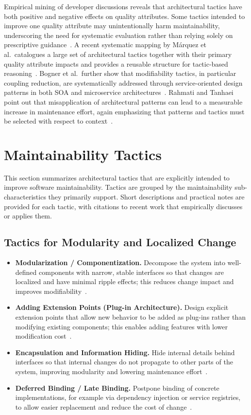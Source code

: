 Empirical mining of developer discussions reveals that architectural tactics have both positive and negative effects on quality attributes. Some tactics intended to improve one quality attribute may unintentionally harm maintainability, underscoring the need for systematic evaluation rather than relying solely on prescriptive guidance~\cite{bi2021mining}. A recent systematic mapping by M\'arquez et al.\ catalogues a large set of architectural tactics together with their primary quality attribute impacts and provides a reusable structure for tactic-based reasoning~\cite{marquez2022architectural}. Bogner et al.\ further show that modifiability tactics, in particular coupling reduction, are systematically addressed through service-oriented design patterns in both SOA and microservice architectures~\cite{bogner2019modifiability}. Rahmati and Tanhaei point out that misapplication of architectural patterns can lead to a measurable increase in maintenance effort, again emphasizing that patterns and tactics must be selected with respect to context~\cite{rahmati2021ensuring}.

\section{Maintainability Tactics}
\label{sec:maintainability_tactics}

This section summarizes architectural tactics that are explicitly intended to improve software maintainability. Tactics are grouped by the maintainability sub-characteristics they primarily support. Short descriptions and practical notes are provided for each tactic, with citations to recent work that empirically discusses or applies them.

\subsection{Tactics for Modularity and Localized Change}
\begin{itemize}
    \item \textbf{Modularization / Componentization.} Decompose the system into well-defined components with narrow, stable interfaces so that changes are localized and have minimal ripple effects; this reduces change impact and improves modifiability~\cite{rahmati2021ensuring}.
    \item \textbf{Adding Extension Points (Plug-in Architecture).} Design explicit extension points that allow new behavior to be added as plug-ins rather than modifying existing components; this enables adding features with lower modification cost~\cite{rahmati2021ensuring}.
    \item \textbf{Encapsulation and Information Hiding.} Hide internal details behind interfaces so that internal changes do not propagate to other parts of the system, improving modularity and lowering maintenance effort~\cite{kim2009qualitydriven}.
    \item \textbf{Deferred Binding / Late Binding.} Postpone binding of concrete implementations, for example via dependency injection or service registries, to allow easier replacement and reduce the cost of change~\cite{rahmati2021ensuring}.
\end{itemize}


